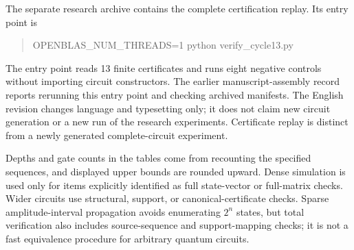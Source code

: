 The separate research archive  contains the complete certification replay. Its entry point is
\begin{quote}\ttfamily\small
OPENBLAS\_NUM\_THREADS=1 python verify\_cycle13.py
\end{quote}
The entry point reads 13 finite certificates and runs eight negative controls without importing circuit constructors. The earlier manuscript-assembly record reports rerunning this entry point and checking archived manifests. The English revision changes language and typesetting only; it does not claim new circuit generation or a new run of the research experiments. Certificate replay is distinct from a newly generated complete-circuit experiment.

Depths and gate counts in the tables come from recounting the specified sequences, and displayed upper bounds are rounded upward. Dense simulation is used only for items explicitly identified as full state-vector or full-matrix checks. Wider circuits use structural, support, or canonical-certificate checks. Sparse amplitude-interval propagation avoids enumerating $2^n$ states, but total verification also includes source-sequence and support-mapping checks; it is not a fast equivalence procedure for arbitrary quantum circuits.
